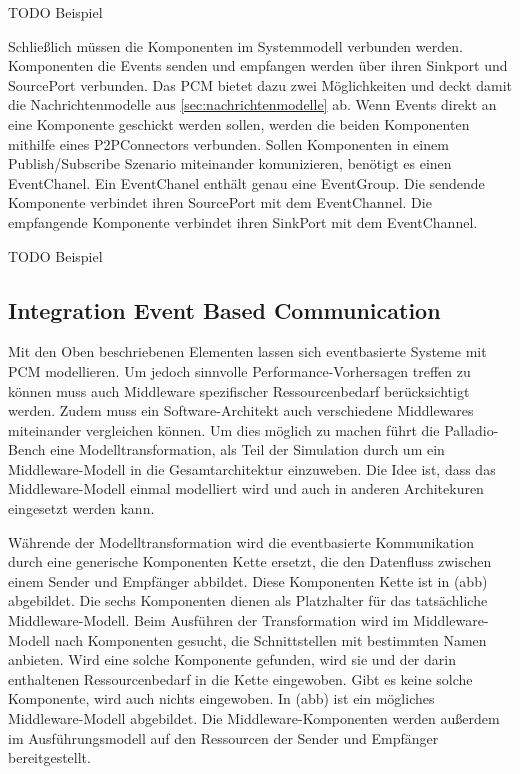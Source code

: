 TODO Beispiel

Schließlich müssen die Komponenten im Systemmodell verbunden werden. Komponenten die Events senden und empfangen werden über ihren Sinkport und SourcePort verbunden. Das PCM bietet dazu zwei Möglichkeiten und deckt damit die Nachrichtenmodelle aus \autoref{sec:nachrichtenmodelle} ab. Wenn Events direkt an eine Komponente geschickt werden sollen, werden die beiden Komponenten mithilfe eines P2PConnectors verbunden. Sollen Komponenten in einem Publish/Subscribe Szenario miteinander komunizieren, benötigt es einen EventChanel. Ein EventChanel enthält genau eine EventGroup. Die sendende Komponente verbindet ihren SourcePort mit dem EventChannel. Die empfangende Komponente verbindet ihren SinkPort mit dem EventChannel. 

TODO Beispiel



\subsection{Integration Event Based Communication}
Mit den Oben beschriebenen Elementen lassen sich eventbasierte Systeme mit PCM modellieren. Um jedoch sinnvolle Performance-Vorhersagen treffen zu können muss auch Middleware spezifischer Ressourcenbedarf berücksichtigt werden. Zudem muss ein Software-Architekt auch verschiedene Middlewares miteinander vergleichen können. Um dies möglich zu machen führt die Palladio-Bench eine Modelltransformation, als Teil der Simulation durch um ein Middleware-Modell in die Gesamtarchitektur einzuweben. Die Idee ist, dass das Middleware-Modell einmal modelliert wird und auch in anderen Architekuren eingesetzt werden kann.\par
Währende der Modelltransformation wird die eventbasierte Kommunikation durch eine generische Komponenten Kette ersetzt, die den Datenfluss zwischen einem Sender und Empfänger abbildet. Diese Komponenten Kette ist in (abb) abgebildet. Die sechs Komponenten dienen als Platzhalter für das tatsächliche Middleware-Modell. Beim Ausführen der Transformation wird im Middleware-Modell nach Komponenten gesucht, die Schnittstellen mit bestimmten Namen anbieten. Wird eine solche Komponente gefunden, wird sie und der darin enthaltenen Ressourcenbedarf in die Kette eingewoben. Gibt es keine solche Komponente, wird auch nichts eingewoben. In (abb) ist ein mögliches Middleware-Modell abgebildet. Die Middleware-Komponenten werden außerdem im  Ausführungsmodell auf den Ressourcen der Sender und Empfänger bereitgestellt. 



